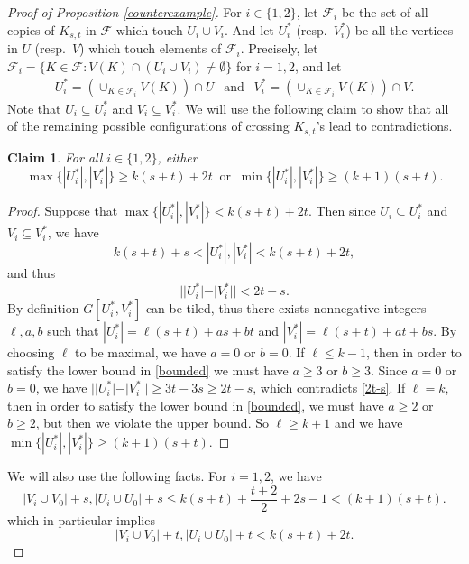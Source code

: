 \documentclass[oneside,12pt]{memoir}
\newtheorem{claim}[theorem]{Claim}
\begin{document}
\begin{proof}[Proof of Proposition \ref{counterexample}]
For $i\in\{1,2\}$, let $\mathcal{F}_i$ be the set of all copies of $K_{s,t}$ in $\mathcal{F}$ which touch $U_i\cup V_i$. And let $U_i^*$ (resp.~$V_i^*$) be all the vertices in $U$ (resp.~$V$) which touch elements of $\mathcal{F}_i$.  Precisely, let $\mathcal{F}_i=\{K\in \mathcal{F}: V(K)\cap(U_i\cup V_i)\neq\emptyset\}$ for $i=1,2$, and let 
\begin{align*}
U_i^*=\left(\cup_{K\in\mathcal{F}_i}V(K)\right)\cap U ~~\text{ and }~~ V_i^*=\left(\cup_{K\in\mathcal{F}_i}V(K)\right)\cap V.
\end{align*}
Note that $U_i\subseteq U_i^*$ and $V_i\subseteq V_i^*$.  We will use the following claim to show that all of the remaining possible configurations of crossing $K_{s,t}$'s lead to contradictions.

\begin{claim}\label{claim:main}
For all $i\in\{1,2\}$, either $$\max\{|U_i^*|, |V_i^*|\}\geq k(s+t)+2t ~\text{ or }~ \min\{|U_i^*|, |V_i^*|\}\geq (k+1)(s+t).$$
\end{claim}

\begin{proof}
Suppose that $\max\{|U_i^*|, |V_i^*|\}< k(s+t)+2t$.  Then since $U_i\subseteq U_i^*$ and $V_i\subseteq V_i^*$, we have \begin{equation}\label{bounded} k(s+t)+s<|U_i^*|, |V_i^*|<k(s+t)+2t,\end{equation} and thus \begin{equation}\label{2t-s}||U_i^*|-|V_i^*||<2t-s.\end{equation}  By definition $G[U_i^*, V_i^*]$ can be tiled, thus there exists nonnegative integers $\ell, a, b$ such that $|U_i^*|=\ell(s+t)+as+bt$ and $|V_i^*|=\ell(s+t)+at+bs$.  By choosing $\ell$ to be maximal, we have $a=0$ or $b=0$.  
If $\ell\leq k-1$, then in order to satisfy the lower bound in \eqref{bounded} we must have $a\geq 3$ or $b\geq 3$.  Since $a=0$ or $b=0$, we have $||U_i^*|-|V_i^*||\geq 3t-3s\geq 2t-s$, which contradicts \eqref{2t-s}.  If $\ell=k$, then in order to satisfy the lower bound in \eqref{bounded}, we must have $a\geq 2$ or $b\geq 2$, but then we violate the upper bound.  So $\ell\geq k+1$ and we have $\min\{|U_i^*|, |V_i^*|\}\geq (k+1)(s+t)$.
\end{proof}

We will also use the following facts.  For $i=1,2$, we have
\begin{equation}\label{eq:upper}
|V_i\cup V_0|+s, |U_i\cup U_0|+s\leq k(s+t)+\frac{t+2}{2}+2s-1<(k+1)(s+t).
\end{equation}
which in particular implies
\begin{equation}\label{eq:upper2t}
|V_i\cup V_0|+t, |U_i\cup U_0|+t<k(s+t)+2t.
\end{equation}



\end{proof}
\end{document}
